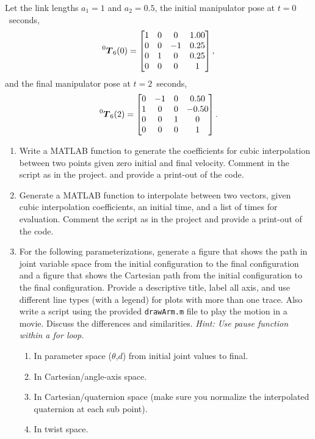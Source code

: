 \documentclass[12pt]{article}
\newenvironment{problem}[2][Problem]{\begin{trivlist}
\item[\hskip \labelsep {\bfseries #1}\hskip \labelsep {\bfseries #2.}]}{\end{trivlist}}
\begin{document}
\begin{problem}{1}
Let the link lengths $a_1 =1$ and $a_2=0.5$, the initial manipulator pose at $t=0$~seconds,
\begin{align*}
    \prescript{0}{}{\boldsymbol{T}}_6(0) = \begin{bmatrix}
        1 & 0 & 0  & 1.00 \\
        0 & 0 & -1 & 0.25 \\
        0 & 1 & 0  & 0.25 \\
        0 & 0 & 0  & 1
    \end{bmatrix},
\end{align*}
and the final manipulator pose at $t=2$~seconds,
\begin{align*}
    \prescript{0}{}{\boldsymbol{T}}_6(2) = \begin{bmatrix}
        0 & -1 & 0 & 0.50  \\
        1 & 0  & 0 & -0.50 \\
        0 & 0  & 1 & 0     \\
        0 & 0  & 0 & 1
    \end{bmatrix}.
\end{align*}


\begin{enumerate}[label=(\alph*)]
    \item Write a MATLAB function to generate the coefficients for cubic interpolation between two points given zero initial and final velocity. Comment in the script as in the project. and provide a print-out of the code.
    \item Generate a MATLAB function to interpolate between two vectors, given cubic interpolation coefficients, an initial time, and a list of times for evaluation. Comment the script as in the project and provide a print-out of the code.
    \item For the following parameterizations, generate a figure that shows the path in joint variable space from the initial configuration to the final configuration and a figure that shows the Cartesian path from the initial configuration to the final configuration. Provide a descriptive title, label all axis, and use different line types (with a legend) for plots with more than one trace. Also write a script using the provided \verb|drawArm.m| file to play the motion in a movie. Discuss the differences and similarities. \textit{Hint: Use pause function within a for loop.}
    \begin{enumerate}[label=\roman*.]
        \item In parameter space ($\theta$,$d$) from initial joint values to final.
        \item In Cartesian/angle-axis space.
        \item In Cartesian/quaternion space (make sure you normalize the interpolated quaternion at each sub point).
        \item In twist space.
    \end{enumerate}
\end{enumerate}
 
\end{problem}
\end{document}
